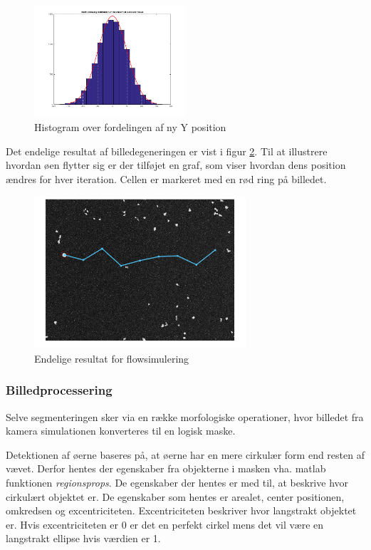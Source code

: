 \begin{figure}[H]
	\centering
	\includegraphics[width=0.5\textwidth]{billeder/software/histfit.png}
	\caption{Histogram over fordelingen af ny Y position}
	\label{fig:histfit}
\end{figure}

Det endelige resultat af billedegeneringen er vist i figur \ref{fig:finalresult}. Til at illustrere hvordan øen flytter sig er der tilføjet en graf, som viser hvordan dens position ændres for hver iteration. Cellen er markeret med en rød ring på billedet.

\begin{figure}[H]
	\centering
	\includegraphics[width=0.7\textwidth]{billeder/software/final.png}
	\caption{Endelige resultat for flowsimulering}
	\label{fig:finalresult}
\end{figure}

\subsubsection{Billedprocessering}
Selve segmenteringen sker via en række morfologiske operationer, hvor billedet fra kamera simulationen konverteres til en logisk maske. 

Detektionen af øerne baseres på, at øerne har en mere cirkulær form end resten af vævet. Derfor hentes der egenskaber fra objekterne i masken vha. matlab funktionen \textit{regionsprops}. De egenskaber der hentes er med til, at beskrive hvor cirkulært objektet er. De egenskaber som hentes er arealet, center positionen, omkredsen og excentriciteten. Excentriciteten beskriver hvor langstrakt objektet er. Hvis excentriciteten er 0 er det en perfekt cirkel mens det vil være en langstrakt ellipse hvis værdien er 1.

